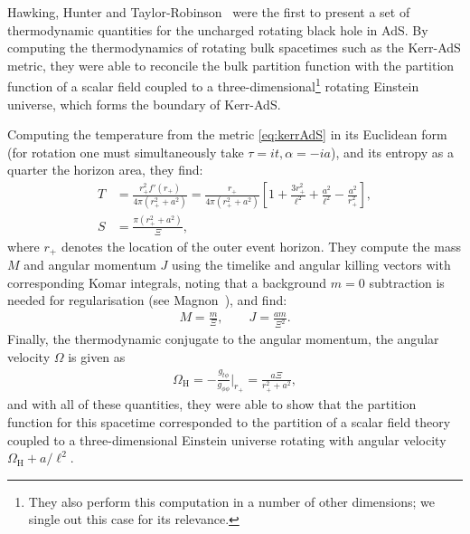 \documentclass[
twoside,
openright,
frontopenright,
]{dmathesis}
\newcommand{\nn}{\nonumber}
\begin{document}
Hawking, Hunter and Taylor-Robinson~\cite{Hawking:1998kw} were the first to
present a set of thermodynamic quantities for the uncharged rotating black hole
in AdS. By computing the thermodynamics of rotating bulk spacetimes such as the
Kerr-AdS metric, they were able to reconcile the bulk partition function with
the partition function of a scalar field coupled to a
three-dimensional\footnote{They also perform this computation in a number of
  other dimensions; we single out this case for its relevance.} rotating
Einstein universe, which forms the boundary of Kerr-AdS. 

Computing the temperature from the metric \cref{eq:kerrAdS} in its Euclidean
form (for rotation one must simultaneously take $\tau=it, \alpha=-ia$), and its
entropy as a quarter the horizon area, they find:
\begin{align}
  \label{eq:kerrAdSTS}
  T&=\frac{r_+^2f'(r_+)}{4\pi(r_+^2+a^2)} = \frac{r_+}{4\pi(r_+^2+a^2)} \left[1 +
  \frac{3r_+^2}{\ell^2} + \frac{a^2}{\ell^2} - \frac{a^2}{r_+^2}\right],\nn\\
  S&=\frac{\pi(r_+^2+a^2)}{\Xi},
\end{align}
where $r_+$ denotes the location of the outer event horizon. They compute the
mass $M$ and angular momentum $J$ using the timelike and angular killing vectors
with corresponding Komar integrals, noting that a background $m=0$ subtraction
is needed for regularisation (see Magnon~\cite{Magnon:1985sc}), and find:
\begin{align}
  \label{eq:kerrAdSMJ-HTT}
  M=\frac{m}{\Xi}, \qquad J=\frac{am}{\Xi^2}.
\end{align}
Finally, the thermodynamic conjugate to the angular momentum, the angular
velocity $\Omega$ is given as
\begin{align}
  \label{eq:kerrAdSO-HTT}
  \Omega_\mathrm{H} = -\frac{g_{t\phi}}{g_{\phi\phi}}\Big|_{r_+} = \frac{a\Xi}{r_+^2+a^2},
\end{align}
and with all of these quantities, they were able to show that the partition
function for this spacetime corresponded to the partition of a scalar field
theory coupled to a three-dimensional Einstein universe rotating with angular
velocity $\Omega_\mathrm{H} + a/\ell^2$.
\end{document}
